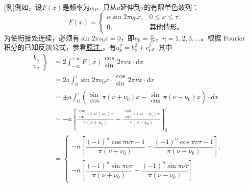 \documentclass[fontsize=13pt,twoside,openany,headings=normal,parskip=false,bookmarkpackage=false,DIV=calc]{scrbook}
\begin{document}
[例]{例如，设$F(x)$是频率为$\nu_0$、只从$a$延伸到$\tau$的有限单色波列：
\[
F(x)=\begin{cases}\alpha\sin2\pi\nu_0x,&0\le x\le\tau,\\0,&\text{其他情形。}\end{cases}
\]
为使衔接处连续，必须有$\sin2\pi\nu_0\tau=0$，即$\nu_0=\frac n{2\tau}$，$n=1,\allowbreak 2,\allowbreak 3,\allowbreak \ldots$。根据 Fourier 积分的已知反演公式，参看\CJKglue \hyperlink{note-87}{原注 }，有$a_\nu^2=b_\nu^2+c_\nu^2$，其中
\begin{align*}
\left.\begin{matrix}b_\nu\\c_\nu\end{matrix}\right\}
&=2\int_{-\infty}^{+\infty}F(x)\begin{matrix}\cos\\\sin\end{matrix}2\pi\nu x\cdot dx\\
&=2a\int_0^\tau\sin2\pi\nu_0x\cdot\begin{matrix}\cos\\\sin\end{matrix}2\pi\nu x\cdot dx\\
&=\pm a\int_0^\tau\left(\begin{matrix}\sin\\\cos\end{matrix}\pi(\nu+\nu_0)x
-\begin{matrix}\sin\\\cos\end{matrix}\pi(\nu-\nu_0)x\right)\cdot dx\\
&=-a\left[\frac{\begin{matrix}\cos\\\sin\end{matrix}\pi(\nu+\nu_0)x}{\pi(\nu+\nu_0)}
-\frac{\begin{matrix}\cos\\\sin\end{matrix}\pi(\nu-\nu_0)x}{\pi(\nu-\nu_0)}\right]_0^\tau\\
&=\begin{cases}
-a\left[\dfrac{(-1)^n\cos\pi\nu\tau-1}{\pi(\nu+\nu_0)}-\dfrac{(-1)^n\cos\pi\nu\tau-1}{\pi(\nu-\nu_0)}\right],\\[6pt]
-a\left[\dfrac{(-1)^n\sin\pi\nu\tau}{\pi(\nu+\nu_0)}-\dfrac{(-1)^n\sin\pi\nu\tau}{\pi(\nu-\nu_0)}\right]

\end{cases}
\end{align*}}
\end{document}
